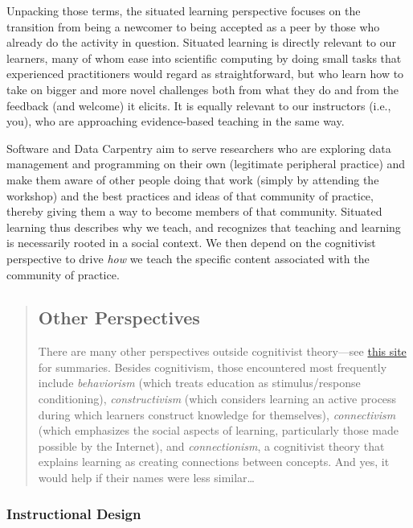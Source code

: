 Unpacking those terms,
the situated learning perspective focuses on the transition from
being a newcomer to being accepted as a peer by those who already do the activity in question.
Situated learning is directly relevant to our learners,
many of whom ease into scientific computing by doing small tasks
that experienced practitioners would regard as straightforward,
but who learn how to take on bigger and more novel challenges
both from what they do and from the feedback (and welcome) it elicits.
It is equally relevant to our instructors (i.e., you),
who are approaching evidence-based teaching in the same way.

Software and Data Carpentry aim to serve researchers
who are exploring data management and programming on their own (legitimate peripheral practice)
and make them aware of other people doing that work (simply by attending the workshop)
and the best practices and ideas of that community of practice,
thereby giving them a way to become members of that community.
Situated learning thus describes why we teach,
and recognizes that teaching and learning is necessarily rooted in a social context.
We then depend on the cognitivist perspective
to drive \emph{how} we teach the specific content associated with the community of practice.

\begin{quotation}   %
\subsection*{Other Perspectives}

There are many other perspectives outside cognitivist theory---see
\href{http://www.learning-theories.com/}{this site} for summaries.
Besides cognitivism,
those encountered most frequently include \emph{behaviorism}
(which treats education as stimulus/response conditioning),
\emph{constructivism}
(which considers learning an active process during which learners construct knowledge for themselves),
\emph{connectivism}
(which emphasizes the social aspects of learning, particularly those made possible by the Internet),
and \emph{connectionism},
a cognitivist theory that explains learning as creating connections between concepts.
And yes,
it would help if their names were less similar\ldots{}
\end{quotation}   %

\subsubsection*{Instructional Design}

